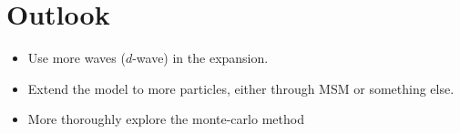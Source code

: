 \documentclass[../main/report.tex]{subfiles}
\begin{document}
\chapter{Outlook}
\label{cha:outlook}

\begin{itemize}
  \item Use more waves ($d$-wave) in the expansion.
  \item Extend the model to more particles, either through MSM or something else.
  \item More thoroughly explore the monte-carlo method
\end{itemize}
\end{document}

